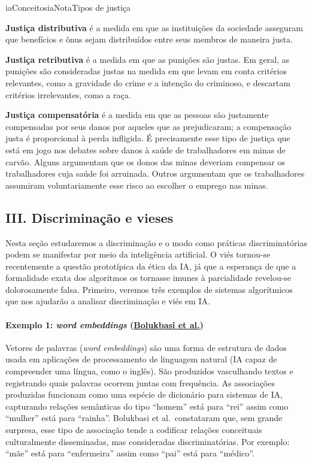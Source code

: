 \documentclass[
  11pt,
]{article}
\newenvironment{nota}[1][Nota]{\begin{iabox}{iaConceitos}{iaNota}{#1}}{\end{iabox}}
\begin{document}
\begin{nota}[Tipos de justiça]

\textbf{Justiça distributiva} é a medida em que as instituições da
sociedade asseguram que benefícios e ônus sejam distribuídos entre seus
membros de maneira justa.

\textbf{Justiça retributiva} é a medida em que as punições são justas.
Em geral, as punições são consideradas justas na medida em que levam em
conta critérios relevantes, como a gravidade do crime e a intenção do
criminoso, e descartam critérios irrelevantes, como a raça.

\textbf{Justiça compensatória} é a medida em que as pessoas são
justamente compensadas por seus danos por aqueles que as prejudicaram; a
compensação justa é proporcional à perda infligida. É precisamente esse
tipo de justiça que está em jogo nos debates sobre danos à saúde de
trabalhadores em minas de carvão. Alguns argumentam que os donos das
minas deveriam compensar os trabalhadores cuja saúde foi arruinada.
Outros argumentam que os trabalhadores assumiram voluntariamente esse
risco ao escolher o emprego nas minas.

\end{nota}

\subsection{III. Discriminação e
vieses}\label{iii.-discriminauxe7uxe3o-e-vieses}

Nesta seção estudaremos a discriminação e o modo como práticas
discriminatórias podem se manifestar por meio da inteligência
artificial. O viés tornou-se recentemente a questão prototípica da ética
da IA, já que a esperança de que a formalidade exata dos algoritmos os
tornasse imunes à parcialidade revelou-se dolorosamente falsa. Primeiro,
veremos três exemplos de sistemas algorítmicos que nos ajudarão a
analisar discriminação e viés em IA.

\paragraph{\texorpdfstring{Exemplo 1: \emph{word embeddings}
(\href{https://arxiv.org/abs/1607.06520}{Bolukbasi et
al.})}{Exemplo 1: word embeddings (Bolukbasi et al.)}}\label{exemplo-1-word-embeddings-bolukbasi-et-al.}

Vetores de palavras (\emph{word embeddings}) são uma forma de estrutura
de dados usada em aplicações de processamento de linguagem natural (IA
capaz de compreender uma língua, como o inglês). São produzidos
vasculhando textos e registrando quais palavras ocorrem juntas com
frequência. As associações produzidas funcionam como uma espécie de
dicionário para sistemas de IA, capturando relações semânticas do tipo
``homem'' está para ``rei'' assim como ``mulher'' está para ``rainha''.
Bolukbasi et al.~constataram que, sem grande surpresa, esse tipo de
associação tende a codificar relações conceituais culturalmente
disseminadas, mas consideradas discriminatórias. Por exemplo: ``mãe''
está para ``enfermeira'' assim como ``pai'' está para ``médico''.
\end{document}
